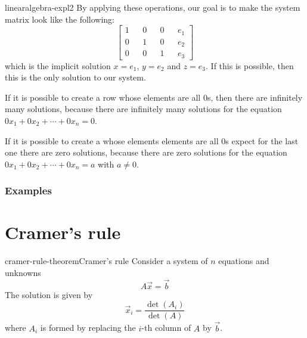\documentclass[preview]{standalone}
\begin{document}

\begin{snippet}{linearalgebra-expl2}
By applying these operations, our goal is to make the system matrix
look like the following:
\[
    \begin{bmatrix} 
        1 && 0 && 0 && e_1 \\
        0 && 1 && 0 && e_2 \\
        0 && 0 && 1 && e_3
    \end{bmatrix}
\]
which is the implicit solution
\(x=e_1\), \(y=e_2\) and \(z=e_3\).
If this is possible, then this is the only solution to our system.

\vspace{.25cm}

If it is possible to create a row whose elements are all \(0\)s,
then there are infinitely many solutions, because
there are infinitely many solutions for the equation
\(0x_1+0x_2+\cdots+0x_n = 0\).

\vspace{.25cm}

If it is possible to create a whose elements elements
are all \(0\)s expect for the last one there are zero solutions,
because there are zero solutions for the equation
\(0x_1+0x_2+\cdots+0x_n = a\) with \(a \neq 0\).
\end{snippet}

\subsubsection{Examples}


\section{Cramer's rule}

\begin{snippettheorem}{cramer-rule-theorem}{Cramer's rule}
    Consider a system of \(n\) equations and unknowns
    \[
        A\vec{x}=\vec{b}
    \]
    The solution is given by
    \[
        \vec{x}_i = \frac{\det(A_i)}{\det(A)}
    \]
    where \(A_i\) is formed by replacing the \(i\)-th column
    of \(A\) by \(\vec{b}\).
\end{snippettheorem}
\end{document}
